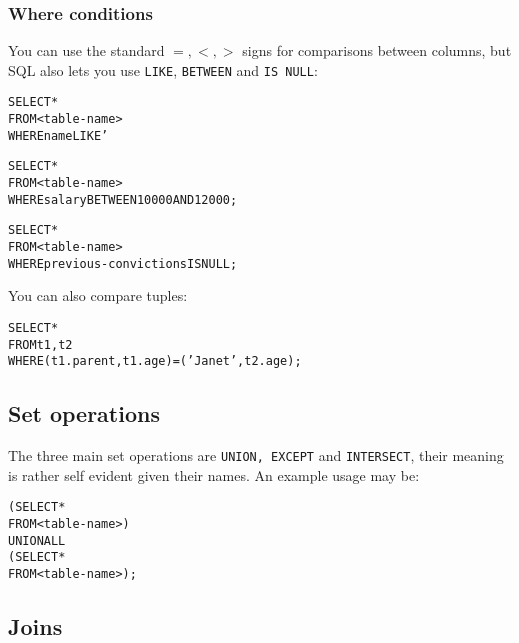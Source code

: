 \begin{mymulticols}
  \subsubsection{Where conditions}

  You can use the standard $=, <, >$ signs for comparisons between columns,
  but SQL also lets you use \texttt{LIKE}, \texttt{BETWEEN} and \texttt{IS NULL}:

  \begin{alltt}
    SELECT *\\
    FROM <table-name>\\
    WHERE name LIKE '%BOB%';
  \end{alltt}

  \begin{alltt}
    SELECT *\\
    FROM <table-name>\\
    WHERE salary BETWEEN 10000 AND 12000;
  \end{alltt}

  \begin{alltt}
    SELECT *\\
    FROM <table-name>\\
    WHERE previous-convictions IS NULL;
  \end{alltt}

  You can also compare tuples:

  \begin{alltt}
    SELECT *\\
    FROM t1, t2\\
    WHERE (t1.parent, t1.age) = ('Janet', t2.age);
  \end{alltt}

  \subsection{Set operations}

  The three main set operations are \texttt{UNION, EXCEPT} and \texttt{INTERSECT},
  their meaning is rather self evident given their names. An example usage may be:

  \begin{alltt}
    (SELECT *\\
     FROM <table-name>)\\
    UNION ALL\\
    (SELECT *\\
     FROM <table-name>);
  \end{alltt}

  \subsection{Joins}


\end{mymulticols}
